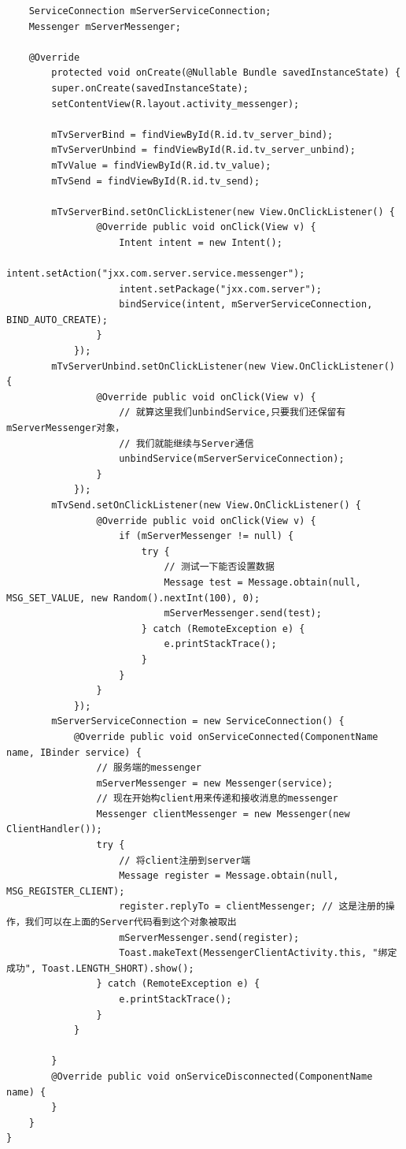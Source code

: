 \documentclass[9pt, b5paper]{article}
\begin{document}
\begin{enumerate}
\begin{verbatim}
    ServiceConnection mServerServiceConnection;
    Messenger mServerMessenger;

    @Override
        protected void onCreate(@Nullable Bundle savedInstanceState) {
        super.onCreate(savedInstanceState);
        setContentView(R.layout.activity_messenger);

        mTvServerBind = findViewById(R.id.tv_server_bind);
        mTvServerUnbind = findViewById(R.id.tv_server_unbind);
        mTvValue = findViewById(R.id.tv_value);
        mTvSend = findViewById(R.id.tv_send);

        mTvServerBind.setOnClickListener(new View.OnClickListener() {
                @Override public void onClick(View v) {
                    Intent intent = new Intent();
                    intent.setAction("jxx.com.server.service.messenger");
                    intent.setPackage("jxx.com.server");
                    bindService(intent, mServerServiceConnection, BIND_AUTO_CREATE);
                }
            });
        mTvServerUnbind.setOnClickListener(new View.OnClickListener() {
                @Override public void onClick(View v) {
                    // 就算这里我们unbindService,只要我们还保留有mServerMessenger对象，
                    // 我们就能继续与Server通信
                    unbindService(mServerServiceConnection);
                }
            });
        mTvSend.setOnClickListener(new View.OnClickListener() {
                @Override public void onClick(View v) {
                    if (mServerMessenger != null) {
                        try {
                            // 测试一下能否设置数据
                            Message test = Message.obtain(null, MSG_SET_VALUE, new Random().nextInt(100), 0);
                            mServerMessenger.send(test);
                        } catch (RemoteException e) {
                            e.printStackTrace();
                        }
                    }
                }
            });
        mServerServiceConnection = new ServiceConnection() {
            @Override public void onServiceConnected(ComponentName name, IBinder service) {
                // 服务端的messenger
                mServerMessenger = new Messenger(service);
                // 现在开始构client用来传递和接收消息的messenger
                Messenger clientMessenger = new Messenger(new ClientHandler());
                try {
                    // 将client注册到server端
                    Message register = Message.obtain(null, MSG_REGISTER_CLIENT);
                    register.replyTo = clientMessenger; // 这是注册的操作，我们可以在上面的Server代码看到这个对象被取出
                    mServerMessenger.send(register);
                    Toast.makeText(MessengerClientActivity.this, "绑定成功", Toast.LENGTH_SHORT).show();
                } catch (RemoteException e) {
                    e.printStackTrace();
                }
            }

        }
        @Override public void onServiceDisconnected(ComponentName name) {
        }
    }
}
\end{verbatim}
\end{enumerate}
\end{document}
